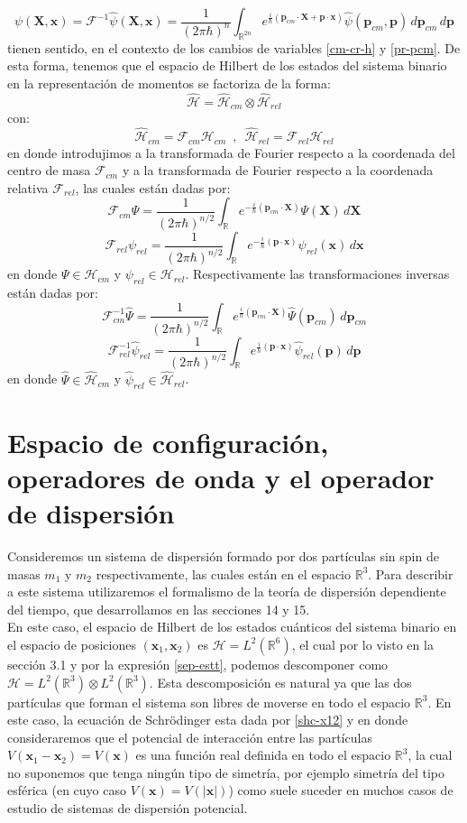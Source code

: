 \documentclass[12pt]{book}
\numberwithin{equation}{chapter}
\def\R{\mathbb{R}}
\def\H{\mathcal{H}}
\def\F{\mathcal{F}}
\def\pr{\otimes}
\def\x{\mathbf{x}}
\def\xx{\mathbf{X}}
\def\P{\mathbf{p}}
\begin{document}
$$ \psi(\xx,\x) =\F^{-1} \hat{\psi}(\xx,\x)= \frac{1}{(2\pi \hbar)^{n}} \int_{\R^{2n}} e^{\frac{i}{\hbar} ( \P_{cm}\cdot \xx + \P \cdot \x ) } \hat{\psi}(\P_{cm},\P) \, d\P_{cm}\, d\P $$
tienen sentido, en el contexto de los cambios de variables \eqref{cm-cr-h} y \eqref{pr-pcm}. De esta forma, tenemos que el espacio de Hilbert de los estados del sistema binario en la representaci\'on de momentos se factoriza de la forma:
\begin{equation}\label{H-em}
\hat{\H}= \hat{\H}_{cm} \pr \hat{\H}_{rel}
\end{equation}
con:
$$ \hat{\H}_{cm}= \F_{cm}\H_{cm} \,\,\,,\,\,\, \hat{\H}_{rel}= \F_{rel}\H_{rel} $$
en donde introdujimos a la transformada de Fourier respecto a la coordenada del centro de masa $\F_{cm}$ y a la transformada de Fourier respecto a la coordenada relativa $\F_{rel}$, las cuales est\'an dadas por:
$$ \F_{cm}\Psi = \frac{1}{(2\pi \hbar)^{n/2}} \int_{\R} e^{-\frac{i}{\hbar} (\P_{cm} \cdot \xx) } \Psi(\xx) \, d\xx $$
$$ \F_{rel}\psi_{rel} = \frac{1}{(2\pi \hbar)^{n/2}} \int_{\R} e^{-\frac{i}{\hbar} (\P \cdot \x) } \psi_{rel}(\x) \, d\x $$
en donde $ \Psi \in \H_{cm} $ y $\psi_{rel} \in \H_{rel}$. Respectivamente las transformaciones inversas est\'an dadas por:
$$ \F_{cm}^{-1}\hat{\Psi} = \frac{1}{(2\pi \hbar)^{n/2}} \int_{\R} e^{\frac{i}{\hbar} (\P_{cm} \cdot \xx) } \hat{\Psi}(\P_{cm}) \, d\P_{cm} $$
$$ \F_{rel}^{-1}\hat{\psi}_{rel} = \frac{1}{(2\pi \hbar)^{n/2}} \int_{\R} e^{\frac{i}{\hbar} (\P \cdot \x) } \hat{\psi}_{rel}(\P) \, d\P $$
en donde $ \hat{\Psi} \in \hat{\H}_{cm} $ y $\hat{\psi}_{rel} \in \hat{\H}_{rel}$.\\

\section{Espacio de configuraci\'on, operadores de onda y el operador de dispersi\'on}
Consideremos un sistema de dispersi\'on formado por dos part\'iculas sin spin de masas $m_{1}$ y $m_{2}$ respectivamente, las cuales est\'an en el espacio $\R^{3}$. Para describir a este sistema utilizaremos el formalismo de la teor\'ia de dispersi\'on dependiente del tiempo, que desarrollamos en las secciones 14 y 15.\\

En este caso, el espacio de Hilbert de los estados cu\'anticos del sistema binario en el espacio de posiciones $(\x_{1} , \x_{2})$ es $\H= L^{2}(\R^{6})$, el cual por lo visto en la secci\'on 3.1 y por la expresi\'on \eqref{sep-estt}, podemos descomponer como $\H= L^{2}(\R^{3}) \pr L^{2}(\R^{3}) $. Esta descomposici\'on es natural ya que las dos part\'iculas que forman el sistema son libres de moverse en todo el espacio $\R^{3}$. En este caso, la ecuaci\'on de Schr\"odinger esta dada por \eqref{shc-x12} y en donde consideraremos que el potencial de interacci\'on entre las part\'iculas $V(\x_{1}-\x_{2})=V(\x)$ es una funci\'on real definida en todo el espacio $\R^{3}$, la cual no suponemos que tenga ning\'un tipo de simetr\'ia, por ejemplo simetr\'ia del tipo esf\'erica (en cuyo caso $V(\x)=V(|\x|)$) como suele suceder en muchos casos de estudio de sistemas de dispersi\'on potencial.\\
\end{document}
